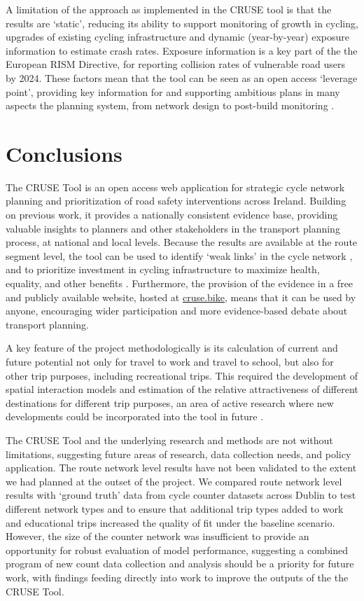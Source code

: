 \documentclass[
  super,
  preprint,
  3p]{elsarticle}
\begin{document}
A limitation of the approach as implemented in the CRUSE tool is that
the results are `static', reducing its ability to support monitoring of
growth in cycling, upgrades of existing cycling infrastructure and
dynamic (year-by-year) exposure information to estimate crash rates.
Exposure information is a key part of the the European RISM Directive,
for reporting collision rates of vulnerable road users by 2024. These
factors mean that the tool can be seen as an open access `leverage
point', providing key information for and supporting ambitious plans in
many aspects the planning system, from network design to post-build
monitoring \citep{lovelace2020}.

\section{Conclusions}\label{sec-conclusions}

The CRUSE Tool is an open access web application for strategic cycle
network planning and prioritization of road safety interventions across
Ireland. Building on previous work, it provides a nationally consistent
evidence base, providing valuable insights to planners and other
stakeholders in the transport planning process, at national and local
levels. Because the results are available at the route segment level,
the tool can be used to identify `weak links' in the cycle network
\citep{vybornova2022}, and to prioritize investment in cycling
infrastructure to maximize health, equality, and other benefits
\citep{mahfouz, woodcock2021}. Furthermore, the provision of the
evidence in a free and publicly available website, hosted at
\href{https://cruse.bike}{cruse.bike}, means that it can be used by
anyone, encouraging wider participation and more evidence-based debate
about transport planning.

A key feature of the project methodologically is its calculation of
current and future potential not only for travel to work and travel to
school, but also for other trip purposes, including recreational trips.
This required the development of spatial interaction models and
estimation of the relative attractiveness of different destinations for
different trip purposes, an area of active research where new
developments could be incorporated into the tool in future
\citep{hasova2022}.

The CRUSE Tool and the underlying research and methods are not without
limitations, suggesting future areas of research, data collection needs,
and policy application. The route network level results have not been
validated to the extent we had planned at the outset of the project. We
compared route network level results with `ground truth' data from cycle
counter datasets across Dublin to test different network types and to
ensure that additional trip types added to work and educational trips
increased the quality of fit under the baseline scenario. However, the
size of the counter network was insufficient to provide an opportunity
for robust evaluation of model performance, suggesting a combined
program of new count data collection and analysis should be a priority
for future work, with findings feeding directly into work to improve the
outputs of the the CRUSE Tool.
\end{document}
